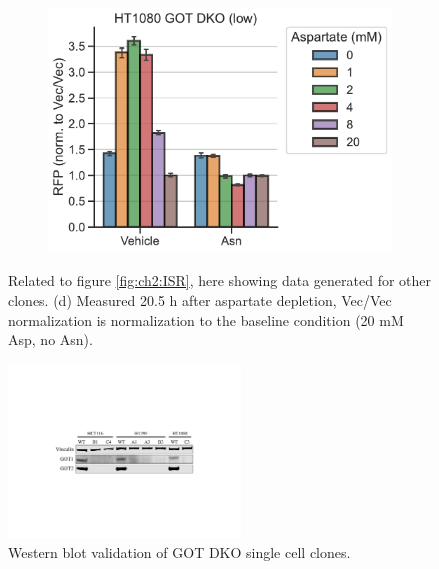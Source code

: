\begin{figure}
\begin{subfigure}[b]{0.4\textwidth}
         \caption{}
         \label{fig:app_ch2:HT1080_Atp_ATF4rep}
     \end{subfigure}
     \hspace{0.06\textwidth}
     \begin{subfigure}[b]{0.4\textwidth}
         \includegraphics[width=\textwidth]{figures/chap2/app/HT1080_GOT_DKO_Asp_ATF4rep.pdf}
         \caption{}
         \label{fig:app_ch2:HT1080_GOT_DKO_Asp_ATF4rep}
     \end{subfigure}
        \caption[Mito inhibitor induced ATF4 is rescued by Asn, other clones]{
        Related to figure \ref{fig:ch2:ISR}, here showing data generated for other clones.
        (d) Measured 20.5 h after aspartate depletion, Vec/Vec normalization is normalization to the baseline condition (20 mM Asp, no Asn).
        }
        \label{fig:app_ch2:ISR}
\end{figure}




\begin{figure}
    \centering
    \includegraphics[width=0.55\textwidth]{figures/chap2/app/GOT_DKO_western.pdf}
    \caption[GOT DKO western blot validation]{
    Western blot validation of GOT DKO single cell clones.
    }
    \label{fig:app_ch2:GOT_DKO_western}
\end{figure}








